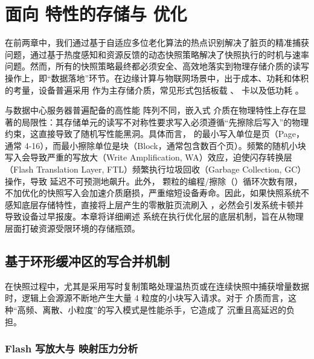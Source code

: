 
\chapter{面向  特性的存储与  优化}

在前两章中，我们通过基于自适应多位老化算法的热点识别解决了脏页的精准捕获问题，通过基于热度感知和资源反馈的动态快照策略解决了快照执行的时机与速率问题。然而，所有的快照策略最终都必须安全、高效地落实到物理存储介质的读写操作上，即“数据落地”环节。在边缘计算与物联网场景中，出于成本、功耗和体积的考量，设备普遍采用  作为主存储介质，常见形式包括板载 、 卡以及低功耗 。

与数据中心服务器普遍配备的高性能  阵列不同，嵌入式  介质在物理特性上存在显著的局限性：其存储单元的读写不对称性要求写入必须遵循“先擦除后写入”的物理约束，这直接导致了随机写性能黑洞\cite{yao2017flashsurvey, gal2012exploring, hu2020writeamp}。具体而言， 的最小写入单位是页（Page，通常 4-16），而最小擦除单位是块（Block，通常包含数百个页）。频繁的随机小块写入会导致严重的写放大（Write Amplification, WA）效应，迫使闪存转换层（Flash Translation Layer, FTL）频繁执行垃圾回收（Garbage Collection, GC）操作，导致  延迟不可预测地飙升。此外， 颗粒的编程/擦除（）循环次数有限，不加优化的快照写入会加速介质磨损，严重缩短设备寿命\cite{hu2020writeamp, gal2018nand}。因此，如果快照系统不感知底层存储特性，直接将上层产生的零散脏页流刷入 ，必然会引发系统卡顿并导致设备过早报废。本章将详细阐述  系统在执行优化层的底层机制，旨在从物理  层面打破资源受限环境的存储瓶颈。


\section{基于环形缓冲区的写合并机制}

在快照过程中，尤其是采用写时复制策略处理温热页或在连续快照中捕获增量数据时，逻辑上会源源不断地产生大量 4 粒度的小块写入请求。对于  介质而言，这种“高频、离散、小粒度”的写入模式是性能杀手，它造成了  沉重且高延迟的负担。

\subsection{Flash 写放大与  映射压力分析}

